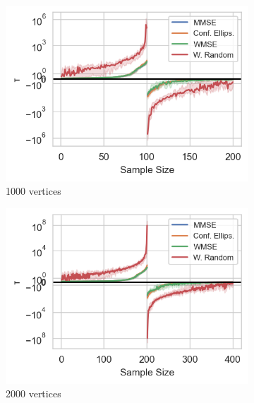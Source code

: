 \begin{figure}%
    \centering
    \begin{subfigure}{0.3\columnwidth}
    \includegraphics[width=\columnwidth]{figures/proj1/plots/LS_threshold/SBM_1000_bandwidth_100_thresholds_LS.png}
    \caption{1000 vertices} 
    \label{snr_SBM_1000}
    \end{subfigure}
    \hfill
    \begin{subfigure}{0.3\columnwidth}
    \includegraphics[width=\columnwidth]{figures/proj1/plots/LS_threshold/SBM_2000_bandwidth_200_thresholds_LS.png}%
    \caption{2000 vertices}%
    \label{snr_SBM_2000}%
    \end{subfigure}
    \hfill%
    \begin{subfigure}{0.3\columnwidth}

\end{subfigure}
\end{figure}
